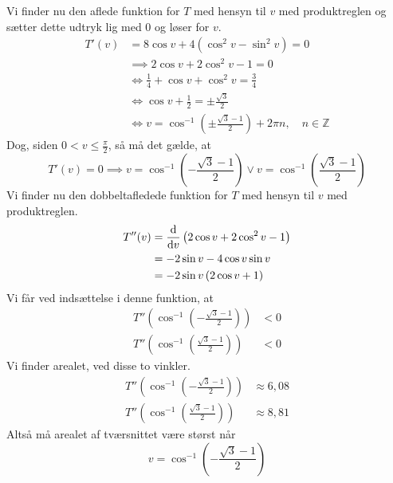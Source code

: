 \documentclass{article}
\begin{document}
Vi finder nu den aflede funktion for $T$ med hensyn til $v$ med produktreglen og sætter dette udtryk lig med 0 og løser for $v$.
\begin{equation*}
\begin{split}
  T'(v)&=8 \cos v + 4 \left(\cos^2 v - \sin^2 v\right) =0 \\ 
  &\implies 2 \cos v + 2 \cos^2 v - 1 =0 \\ 
  &\iff \frac{1}{4} + \cos v + \cos^2 v = \frac{3}{4} \\ 
  &\iff \cos v + \frac{1}{2} = \pm \frac{\sqrt{3} }{2} \\ 
  &\iff v=\cos^{-1} \left(\pm \frac{\sqrt{3} -1}{2}\right) +2\pi n,\quad n \in \mathbb{Z}
\end{split}
\end{equation*}
Dog, siden $0<v\leq \frac{\pi}{2}$, så må det gælde, at
\[
T'(v)=0 \implies v =\cos^{-1}\left(- \frac{\sqrt{3} -1}{2}\right) \lor v =\cos^{-1}\left( \frac{\sqrt{3} -1}{2}\right)
\]
Vi finder nu den dobbeltafledede funktion for $T$ med hensyn til $v$ med produktreglen. 
\begin{equation*}
\begin{split}
  T''(v)&= \dv{v} \left(2 \cos v + 2 \cos^{2} v - 1\right) \\ 
  &= -2\sin v - 4 \cos v\sin v \\ 
  &= -2\sin v \left(2\cos v + 1\right) 
\end{split}
\end{equation*}
Vi får ved indsættelse i denne funktion, at
\begin{equation*}
\begin{split}
  T''\left(\cos^{-1}\left(- \frac{\sqrt{3} -1}{2}\right)\right) &<0 \\ 
  T''\left( \cos^{-1}\left( \frac{\sqrt{3} -1}{2}\right)\right) &<0
\end{split}
\end{equation*}
Vi finder arealet, ved disse to vinkler.
\begin{equation*}
\begin{split}
  T''\left(\cos^{-1}\left(- \frac{\sqrt{3} -1}{2}\right)\right) &\approx 6,08 \\ 
  T''\left( \cos^{-1}\left( \frac{\sqrt{3} -1}{2}\right)\right)  &\approx 8,81
\end{split}
\end{equation*}
Altså må arealet af tværsnittet være størst når 
\[
v=\cos^{-1}\left(- \frac{\sqrt{3} -1}{2}\right)
\] 
\end{document}
